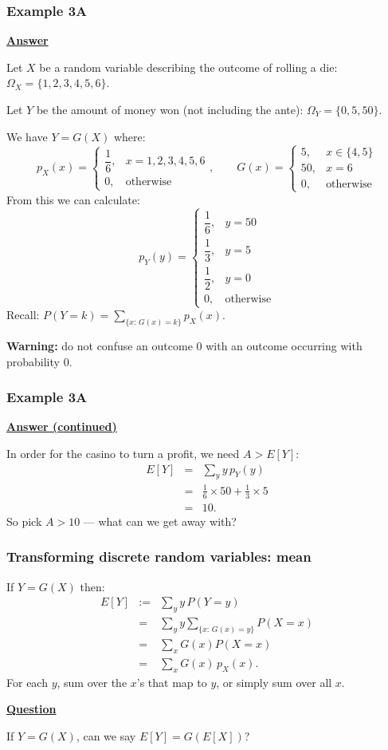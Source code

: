 \documentclass[t,8pt]{beamer}
\begin{document}
\begin{frame}
	\frametitle{Example 3A}
	{\bf\underline{Answer}} \par
	Let $X$ be a random variable describing the outcome of rolling a die: $\Omega_X=\{1,2,3,4,5,6\}$. \par
	Let $Y$ be the amount of money won (not including the ante): $\Omega_Y=\{0,5,50\}$. \par
	We have $Y=G(X)$ where:
	$$
	p_X(x) = \left\{\begin{array}{ll}
		\dfrac 16, & x=1,2,3,4,5,6\\[3pt]
		0, & \text{otherwise}
	\end{array}\right.,
	\qquad
	G(x)=\left\{\begin{array}{ll}
		5, & x\in\{4,5\}\\
		50, & x=6\\
		0, & \text{otherwise}
	\end{array}\right.
	$$
	From this we can calculate:
	$$
	p_Y(y) = \left\{\begin{array}{ll}
		\dfrac 16, & y=50\\[3pt]
		\dfrac 13, & y=5\\[3pt]
		\dfrac 12, & y=0\\[3pt]
		0, & \text{otherwise}
	\end{array}\right.
	$$
	{\small\color{gray}Recall: $P(Y=k)=\sum_{\{x:\,G(x)=k\}} p_X(x)$.} \par
	{\bf Warning:} do not confuse an outcome $0$ with an outcome occurring with probability $0$.
\end{frame}

\begin{frame}
	\frametitle{Example 3A}
	{\bf\underline{Answer (continued)}} \par
	In order for the casino to turn a profit, we need $A>E[Y]$:
	\begin{eqnarray*}
		E[Y]&=&\sum_y y\,p_Y(y)\\
		&=&\frac 16\times 50+\frac 13\times 5\\
		&=&10.
	\end{eqnarray*}
	So pick $A>10$ — what can we get away with?
\end{frame}

\begin{frame}
	\frametitle{Transforming discrete random variables: mean}
	If $Y=G(X)$ then:
	\begin{eqnarray*}
		E[Y]&:=&\sum_y y\,P(Y=y)\\
		&=&\sum_y y\sum_{\{x:\,G(x)=y\}} P(X=x)\\
		&=&\sum_x G(x)P(X=x)\\
		&=&\sum_x G(x)\,p_X(x).
	\end{eqnarray*}
	{\small\color{NavyBlue} For each $y$, sum over the $x$'s that map to $y$, or simply sum over all $x$.} \par
	{\bf\underline{Question}} \par
	If $Y=G(X)$, can we say $E[Y]=G(E[X])$?
\end{frame}
\end{document}
